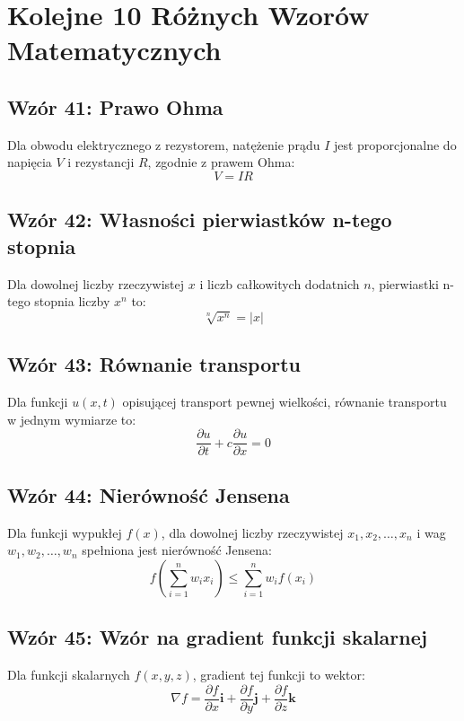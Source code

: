 \documentclass{article}
\begin{document}
\section*{Kolejne 10 Różnych Wzorów Matematycznych}

\subsection*{Wzór 41: Prawo Ohma}

Dla obwodu elektrycznego z rezystorem, natężenie prądu \(I\) jest proporcjonalne do napięcia \(V\) i rezystancji \(R\), zgodnie z prawem Ohma:
\[ V = IR \]

\subsection*{Wzór 42: Własności pierwiastków n-tego stopnia}

Dla dowolnej liczby rzeczywistej \(x\) i liczb całkowitych dodatnich \(n\), pierwiastki n-tego stopnia liczby \(x^n\) to:
\[ \sqrt[n]{x^n} = |x| \]

\subsection*{Wzór 43: Równanie transportu}

Dla funkcji \(u(x, t)\) opisującej transport pewnej wielkości, równanie transportu w jednym wymiarze to:
\[ \frac{\partial u}{\partial t} + c \frac{\partial u}{\partial x} = 0 \]

\subsection*{Wzór 44: Nierówność Jensena}

Dla funkcji wypukłej \(f(x)\), dla dowolnej liczby rzeczywistej \(x_1, x_2, \ldots, x_n\) i wag \(w_1, w_2, \ldots, w_n\) spełniona jest nierówność Jensena:
\[ f\left(\sum_{i=1}^{n} w_i x_i\right) \leq \sum_{i=1}^{n} w_i f(x_i) \]

\subsection*{Wzór 45: Wzór na gradient funkcji skalarnej}

Dla funkcji skalarnych \(f(x, y, z)\), gradient tej funkcji to wektor:
\[ \nabla f = \frac{\partial f}{\partial x} \mathbf{i} + \frac{\partial f}{\partial y} \mathbf{j} + \frac{\partial f}{\partial z} \mathbf{k} \]
\end{document}
